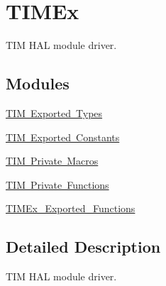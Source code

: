 \hypertarget{group___t_i_m_ex}{}\section{T\+I\+M\+Ex}
\label{group___t_i_m_ex}


T\+IM H\+AL module driver.  


\subsection*{Modules}
\begin{DoxyCompactItemize}
\item 
\mbox{\hyperlink{group___t_i_m_ex___exported___types}{T\+I\+M Exported Types}}
\item 
\mbox{\hyperlink{group___t_i_m_ex___exported___constants}{T\+I\+M Exported Constants}}
\item 
\mbox{\hyperlink{group___t_i_m_ex___private___macros}{T\+I\+M Private Macros}}
\item 
\mbox{\hyperlink{group___t_i_m_ex___private___functions}{T\+I\+M Private Functions}}
\item 
\mbox{\hyperlink{group___t_i_m_ex___exported___functions}{T\+I\+M\+Ex\+\_\+\+Exported\+\_\+\+Functions}}
\end{DoxyCompactItemize}


\subsection{Detailed Description}
T\+IM H\+AL module driver. 

